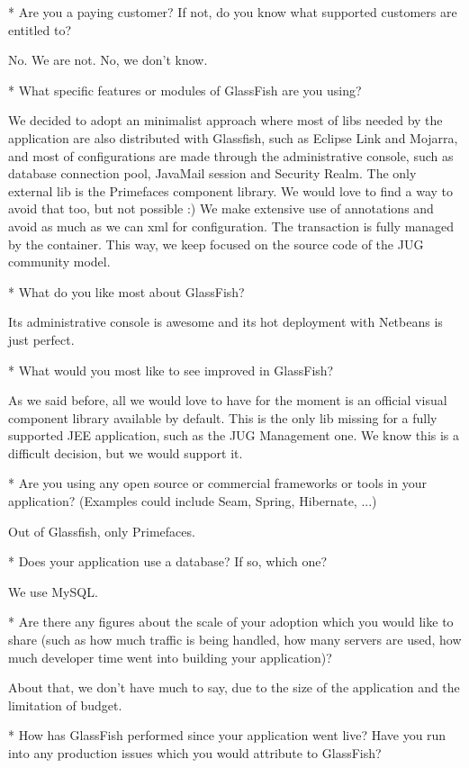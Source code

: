\documentclass[10pt,a4paper]{report}
\begin{document}
* Are you a paying customer? If not, do you know what supported customers are entitled to?

No. We are not. No, we don't know.

* What specific features or modules of GlassFish are you using?

We decided to adopt an minimalist approach where most of libs needed by the application are also distributed with Glassfish, such as Eclipse Link and Mojarra, and most of configurations are made through the administrative console, such as database connection pool, JavaMail session and Security Realm. The only external lib is the Primefaces component library. We would love to find a way to avoid that too, but not possible :) We make extensive use of annotations and avoid as much as we can xml for configuration. The transaction is fully managed by the container. This way, we keep focused on the source code of the JUG community model.

* What do you like most about GlassFish?

Its administrative console is awesome and its hot deployment with Netbeans is just perfect.

* What would you most like to see improved in GlassFish?

As we said before, all we would love to have for the moment is an official visual component library available by default. This is the only lib missing for a fully supported JEE application, such as the JUG Management one. We know this is a difficult decision, but we would support it.

* Are you using any open source or commercial frameworks or tools in your application?
  (Examples could include Seam, Spring, Hibernate, ...)
  
  Out of Glassfish, only Primefaces.

* Does your application use a database? If so, which one? 

We use MySQL.

* Are there any figures about the scale of your adoption which you would like
  to share (such as how much traffic is being handled, how many servers are
  used, how much developer time went into building your application)?
  
About that, we don't have much to say, due to the size of the application and the limitation of budget.  

* How has GlassFish performed since your application went live?  Have you run
  into any production issues which you would attribute to GlassFish?
  
\end{document}
